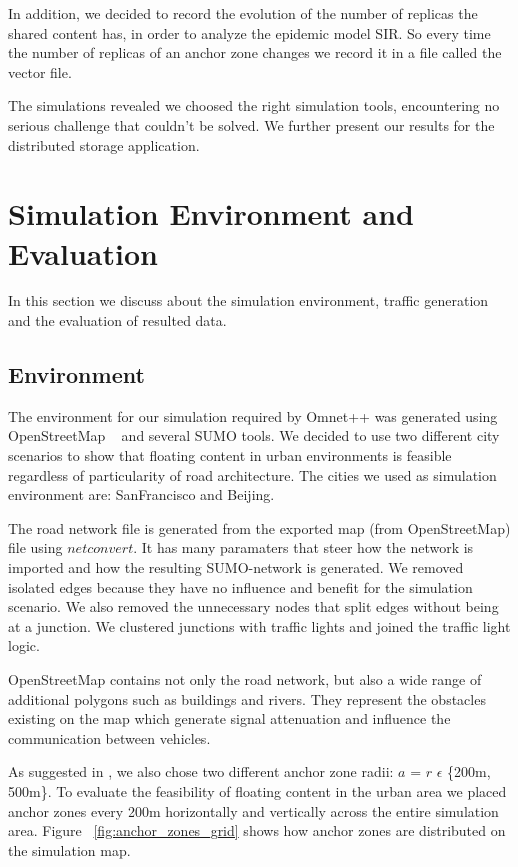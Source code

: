In addition, we decided to record the evolution of the number of replicas the
shared content has, in order to analyze the epidemic model SIR. So every time
the number of replicas of an anchor zone changes we record it in a file called
the vector file.

The simulations revealed we choosed the right simulation tools, encountering no
serious challenge that couldn't be solved. We further present our results for
the distributed storage application.
 

\chapter{Simulation Environment and Evaluation}

In this section we discuss about the simulation environment, traffic
generation and the evaluation of resulted data.

\section{Environment}

The environment for our simulation required by Omnet++ was generated using
OpenStreetMap ~\cite{openstreetmap} and several SUMO tools. We decided to use
two different city scenarios to show that floating content in urban
environments is feasible regardless of particularity of road architecture. The
cities we used as simulation environment are: SanFrancisco and Beijing.

The road network file is generated from the exported map (from OpenStreetMap)
file using $netconvert$. It has many paramaters that steer how the network is
imported and how the resulting SUMO-network is generated. We removed
isolated edges because they have no influence and benefit for the simulation
scenario. We also removed the unnecessary nodes that split edges without being
at a junction. We clustered junctions with traffic lights and joined the traffic
light logic.

OpenStreetMap contains not only the road network, but also a wide range of
additional polygons such as buildings and rivers. They represent the obstacles
existing on the map which generate signal attenuation and influence the
communication between vehicles.

As suggested in \cite{percomfloatingcontent}, we also chose two different anchor
zone radii: $a$ = $r$ $\epsilon$ \{200m, 500m\}. To evaluate the feasibility of
floating content in the urban area we placed anchor zones every 200m
horizontally and vertically across the entire simulation area. Figure
~\ref{fig:anchor_zones_grid} shows how anchor zones are distributed on the
simulation map.

